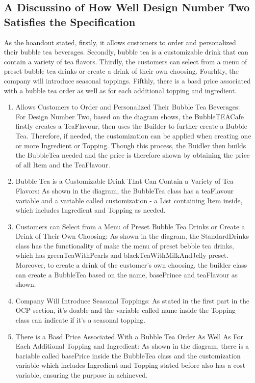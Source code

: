 \documentclass[12pt]{article}
\begin{document}
\subsection{A Discussino of How Well Design Number Two Satisfies the Specification}
As the hoandout stated, firstly, it allows customers to order and personalized their bubble tea beverages. 
Secondly, bubble tea is a customizable drink that can contain a variety of tea flavors. 
Thirdly, the customers can select from a menu of preset bubble tea drinks or create a drink of their own choosing.
Fourhtly, the company will introduce seasonal toppings. 
Fifthly, there is a basd price associated with a bubble tea order as well as for each additional topping and ingredient.

\begin{enumerate}
    \item Allows Customers to Order and Personalized Their Bubble Tea Beverages: For Design Number Two, based on the diagram shows, the BubbleTEACafe firstly creates a TeaFlavour, then uses the Builder to further create a Bubble Tea.
    Therefore, if needed, the customization can be applied when creating one or more Ingredient or Topping.
    Though this process, the Buidler then builds the BubbleTea needed and the price is therefore shown by obtaining the price of all Item and the TeaFlavour.
    \item Bubble Tea is a Customizable Drink That Can Contain a Variety of Tea Flavors: As shown in the diagram, the BubbleTea class has a teaFlavour variable and a variable called customization - a List containing Item inside, which includes Ingredient and Topping as needed.
    \item Customers can Select from a Menu of Preset Bubble Tea Drinks or Create a Drink of Their Own Choosing: As shown in the diagram, the StandardDrinks class has the functionality of make the menu of preset bebble tea drinks, which has greenTeaWithPearls and blackTeaWithMilkAndJelly preset.
    Moreover, to create a drink of the customer's own choosing, the builder class can create a BubbleTea based on the name, basePrince and teaFlavour as shown.
    \item Company Will Introduce Seasonal Toppings: As stated in the first part in the OCP section, it's doable and the variable called name inside the Topping class can indicate if it's a seasonal topping.
    \item There is a Basd Price Associated With a Bubble Tea Order As Well As For Each Additional Topping and Ingredient: As shown in the diagram, there is a bariable called basePrice inside the BubbleTea class and the customization variable which includes Ingredient and Topping stated before also has a cost variable, ensuring the purpose in achineved.
\end{enumerate}
\end{document}
